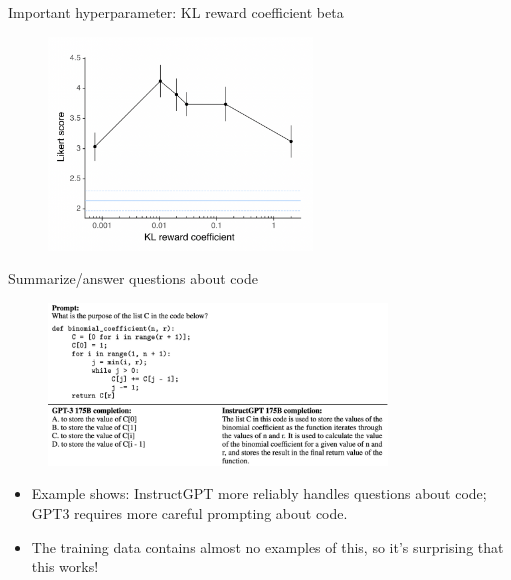\begin{vbframe}{Important hyperparameter: KL reward
	coefficient beta}

\vfill

\begin{figure}
\centering
\includegraphics[width = 7cm]{figure/klrewardcoefficient.png}
\end{figure}

\vfill

\end{vbframe}


\begin{vbframe}{Summarize/answer questions about code}

\vfill

\begin{figure}
\centering
\includegraphics[width = 9cm]{figure/questionsaboutcode.png}
\end{figure}

\begin{itemize}
	\item Example shows: InstructGPT more reliably handles questions
	about code;
        GPT3 requires more careful prompting
	about code.
        \item The training data contains almost no examples
	of this,
 so it's surprising that this works!
\end{itemize}

\vfill

\end{vbframe}



